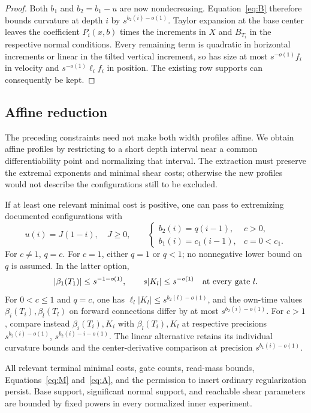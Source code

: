 \begin{proof}
Both $b_1$ and $b_2=b_1-u$ are now nondecreasing.  Equation~\eqref{eq:B}
therefore bounds curvature at depth $i$ by $s^{b_2(i)-o(1)}$.
Taylor expansion at the base center leaves the coefficient $P_i(x,b)$
times the increments in $X$ and $B_{T_i}$ in the respective normal
conditions.  Every remaining term is quadratic in horizontal increments
or linear in the tilted vertical increment, so has size at most
$s^{-o(1)}f_i$ in velocity and $s^{-o(1)}\ell_i f_i$ in position.
The existing row supports can consequently be kept.
\end{proof}

\subsection{Affine reduction}

The preceding constraints need not make both width profiles affine.
We obtain affine profiles by restricting to a short depth interval near
a common differentiability point and normalizing that interval. The
extraction must preserve the extremal exponents and minimal shear costs;
otherwise the new profiles would not describe the configurations still
to be excluded.

\begin{proposition}\label{cyl:affine}
If at least one relevant minimal cost is positive, one can pass to
extremizing documented configurations with
\begin{equation}\tag{F}\label{eq:F}
 u(i)=J(1-i),\quad J\ge0,\qquad
 \begin{cases}
 b_2(i)=q(i-1),&c>0,\\
 b_1(i)=c_1(i-1),&c=0<c_1.
 \end{cases}
\end{equation}
For $c\ne1$, $q=c$.  For $c=1$, either $q=1$ or $q<1$; no
nonnegative lower bound on $q$ is assumed.  In the latter option,
\[
 |\beta_1(T_1)|\le s^{-1-o(1)},\qquad
 s|K_l|\le s^{-o(1)}\quad\hbox{at every gate }l.
\]
For $0<c\le1$ and $q=c$, one has
$\ell_l|K_l|\le s^{b_2(l)-o(1)}$, and the own-time values
$\beta_i(T_i),\beta_l(T_l)$ on forward connections differ by at most
$s^{b_2(i)-o(1)}$.  For $c>1$, compare instead
$\beta_i(T_i),K_i$ with $\beta_l(T_i),K_l$ at respective precisions
$s^{b_2(i)-o(1)}$, $s^{b_2(i)-i-o(1)}$.
The linear alternative retains its individual curvature bounds and the
center-derivative comparison at precision $s^{b_1(i)-o(1)}$.

All relevant terminal minimal costs, gate counts, read-mass bounds,
Equations~\eqref{eq:M} and~\eqref{eq:A}, and the permission to insert
ordinary regularization persist.  Base support, significant normal
support, and reachable shear parameters are bounded by fixed powers
in every normalized inner experiment.
\end{proposition}


